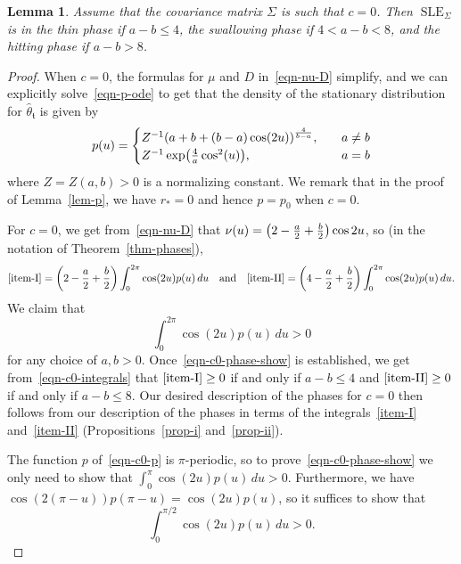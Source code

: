 \documentclass[11pt]{article}
\theoremstyle{plain}
\newtheorem{lem}[thm]{Lemma}
\theoremstyle{definition}
\numberwithin{equation}{section}
\newcommand{\eqb}{\begin{equation}}
\newcommand{\eqe}{\end{equation}}
\newcommand{\frk}{\mathfrak}
\newcommand{\wh}{\widehat}
\newcommand{\SLEG}{{\operatorname{SLE}}_\Sigma}
\let\originalleft\left
\let\originalright\right
\renewcommand{\left}{\mathopen{}\mathclose\bgroup\originalleft}
\renewcommand{\right}{\aftergroup\egroup\originalright}
\begin{document}
\begin{lem} \label{lem-c0-phases}
Assume that the covariance matrix $\Sigma$ is such that $c=0$. 
Then $\SLEG$ is in the thin phase if $a-b\leq 4$, the swallowing phase if $4 < a-b < 8$, and the hitting phase if $a-b > 8$. 
\end{lem}
\begin{proof}
When $c=0$, the formulas for $\mu$ and $D$ in~\eqref{eqn-nu-D} simplify, and we can explicitly solve~\eqref{eqn-p-ode} to get that the density of the stationary distribution for $\wh\theta_{\frk t}$ is given by
\eqb \label{eqn-c0-p}
p(u) = \begin{cases}
Z^{-1} \left( a + b + (b-a) \cos(2u) \right)^{   \frac{4}{b-a}   } ,\quad & a\not= b  \\
Z^{-1} \exp\left(  \frac{4}{a} \cos^2(u) \right) ,\quad & a = b  
\end{cases}
\eqe 
where $Z = Z(a,b) > 0$ is a normalizing constant. We remark that in the proof of Lemma~\ref{lem-p}, we have $r_* = 0$ and hence $p =p_0$ when $c = 0$. 

For $c=0$, we get from~\eqref{eqn-nu-D} that $\nu(u) = \left(2-\frac{a}{2} + \frac{b}{2}\right) \cos{2u}$, so (in the notation of Theorem~\ref{thm-phases}),
\eqb \label{eqn-c0-integrals}
 \ref{item-I}  =  \left(2-\frac{a}{2} + \frac{b}{2}\right)  \int_0^{2\pi}  \cos(2u)  p(u) \, du \quad \text{and} \quad
 \ref{item-II}  = \left(4-\frac{a}{2} + \frac{b}{2}\right)  \int_0^{2\pi}  \cos(2u) p(u) \, du  .
\eqe
We claim that 
\eqb \label{eqn-c0-phase-show}
\int_0^{2\pi}  \cos(2u)  p(u) \, du > 0
\eqe
 for any choice of $a,b > 0$. Once~\eqref{eqn-c0-phase-show} is established, we get from~\eqref{eqn-c0-integrals} that $\ref{item-I} \geq 0$ if and only if $a-b \leq 4$ and $\ref{item-II} \geq 0$ if and only if $a-b\leq 8$. Our desired description of the phases for $c=0$ then follows from our description of the phases in terms of the integrals~\ref{item-I} and~\ref{item-II} (Propositions~\ref{prop-i} and~\ref{prop-ii}).

The function $p$ of~\eqref{eqn-c0-p} is $\pi$-periodic, so to prove~\eqref{eqn-c0-phase-show} we only need to show that $\int_0^\pi \cos(2u) p(u)\,du > 0$. 
Furthermore, we have $\cos(2(\pi - u)) p(\pi-u) = \cos(2u) p(u)$, so it suffices to show that 
\eqb \label{eqn-c0-phase-show'}
\int_0^{\pi/2} \cos(2u)p(u) \,du > 0 . 
\eqe
 

\end{proof}
\end{document}
